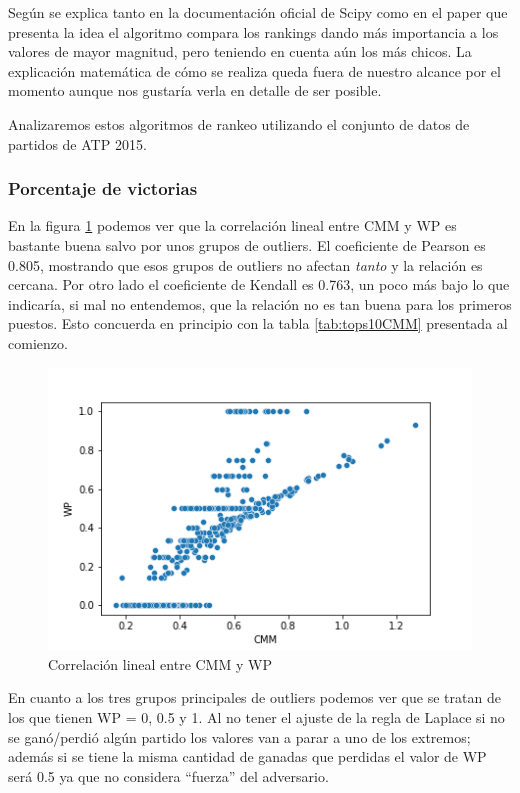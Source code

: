 Según se explica tanto en la documentación oficial de Scipy como en el paper que presenta la idea \cite{kendall} el algoritmo compara los rankings dando más importancia a los valores de mayor magnitud, pero teniendo en cuenta aún los más chicos. La explicación matemática de cómo se realiza queda fuera de nuestro alcance por el momento aunque nos gustaría verla en detalle de ser posible.

Analizaremos estos algoritmos de rankeo utilizando el conjunto de datos de partidos de ATP 2015\cite{repoAtp}.

\FloatBarrier
\subsubsection{Porcentaje de victorias}

En la figura \ref{fig:sc_cmm_wp} podemos ver que la correlación lineal entre CMM y WP es bastante buena salvo por unos grupos de outliers. El coeficiente de Pearson es 0.805, mostrando que esos grupos de outliers no afectan \textit{tanto} y la relación es cercana. Por otro lado el coeficiente de Kendall es 0.763, un poco más bajo lo que indicaría, si mal no entendemos, que la relación no es tan buena para los primeros puestos. Esto concuerda en principio con la tabla \ref{tab:tops10CMM} presentada al comienzo.

\begin{figure}[h]
 \centering
 \includegraphics[scale=0.8]{imagenes/scatterplot_CMM_WP.png}
 \caption{Correlación lineal entre CMM y WP}
 \label{fig:sc_cmm_wp}
\end{figure}

En cuanto a los tres grupos principales de outliers podemos ver que se tratan de los que tienen WP = 0, 0.5 y 1. Al no tener el ajuste de la regla de Laplace si no se ganó/perdió algún partido los valores van a parar a uno de los extremos; además si se tiene la misma cantidad de ganadas que perdidas el valor de WP será 0.5 ya que no considera ``fuerza'' del adversario.\\

